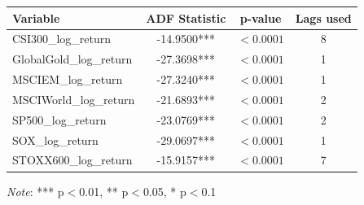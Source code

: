 \begin{tabular}{lccc}
  \toprule
  \textbf{Variable} & \textbf{ADF Statistic} & \textbf{p-value} & \textbf{Lags used} \\ 
  \midrule
  CSI300\_log\_return & -14.9500*** & $< 0.0001$ & 8 \\ 
  GlobalGold\_log\_return & -27.3698*** & $< 0.0001$ & 1 \\ 
  MSCIEM\_log\_return & -27.3240*** & $< 0.0001$ & 1 \\ 
  MSCIWorld\_log\_return & -21.6893*** & $< 0.0001$ & 2 \\ 
  SP500\_log\_return & -23.0769*** & $< 0.0001$ & 2 \\ 
  SOX\_log\_return & -29.0697*** & $< 0.0001$ & 1 \\ 
  STOXX600\_log\_return & -15.9157*** & $< 0.0001$ & 7 \\ 
  \bottomrule
\end{tabular}
\par\vspace{4pt}
\begin{minipage}{\linewidth}
  \footnotesize \textit{Note}: *** p$<$0.01, ** p$<$0.05, * p$<$0.1
\end{minipage}